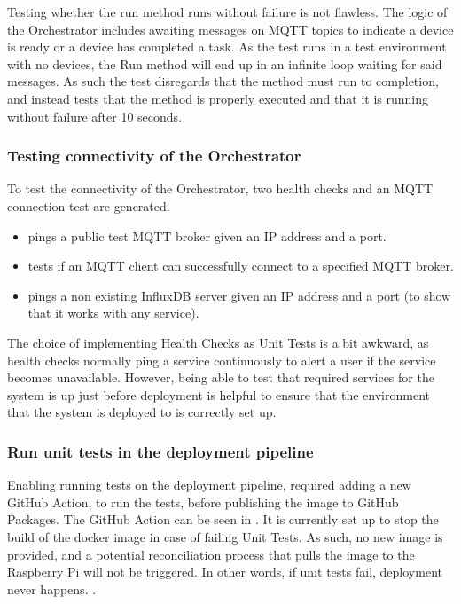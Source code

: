Testing whether the run method runs without failure is not flawless. The logic of the Orchestrator includes awaiting messages on MQTT topics to indicate a device is ready or a device has completed a task. As the test runs in a test environment with no devices, the Run method will end up in an infinite loop waiting for said messages. As such the test disregards that the method must run to completion, and instead tests that the method is properly executed and that it is running without failure after 10 seconds.

\subsubsection*{Testing connectivity of the Orchestrator}

To test the connectivity of the Orchestrator, two health checks and an MQTT connection test are generated. 

\begin{itemize}
    \item {} pings a public test MQTT broker given an IP address and a port.
    \item {} tests if an MQTT client can successfully connect to a specified MQTT broker.
    \item {} pings a non existing InfluxDB server given an IP address and a port (to show that it works with any service).
\end{itemize}

The choice of implementing Health Checks as Unit Tests is a bit awkward, as health checks normally ping a service continuously to alert a user if the service becomes unavailable. However, being able to test that required services for the system is up just before deployment is helpful to ensure that the environment that the system is deployed to is correctly set up.

\subsubsection*{Run unit tests in the deployment pipeline}

Enabling running tests on the deployment pipeline, required adding a new GitHub Action, to run the tests, before publishing the image to GitHub Packages. The GitHub Action can be seen in . It is currently set up to stop the build of the docker image in case of failing Unit Tests. As such, no new image is provided, and a potential reconciliation process that pulls the image to the Raspberry Pi will not be triggered. In other words, if unit tests fail, deployment never happens. \cite{github-actions-docs}.

